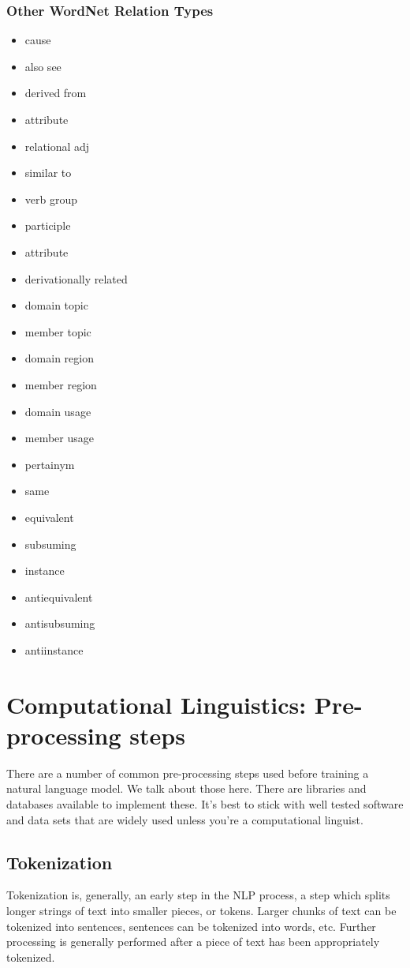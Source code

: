 \subsubsection{Other WordNet Relation Types}
\begin{itemize}
\item cause
\item also see
\item derived from
\item attribute
\item relational adj
\item similar to
\item verb group
\item participle
\item attribute
\item derivationally related
\item domain topic
\item member topic
\item domain region
\item member region
\item domain usage
\item member usage
\item pertainym
\item same
\item equivalent
\item subsuming
\item instance
\item antiequivalent
\item antisubsuming
\item antiinstance
\end{itemize}

\section{Computational Linguistics: Pre-processing steps}

There are a number of common pre-processing steps used before training a natural language model. We talk about those here. There are libraries and databases available to implement these. It's best to stick with well tested software and data sets that are widely used unless you're a computational linguist. 

\subsection{Tokenization}

Tokenization is, generally, an early step in the NLP process, a step which splits longer strings of text into smaller pieces, or tokens. Larger chunks of text can be tokenized into sentences, sentences can be tokenized into words, etc. Further processing is generally performed after a piece of text has been appropriately tokenized.

